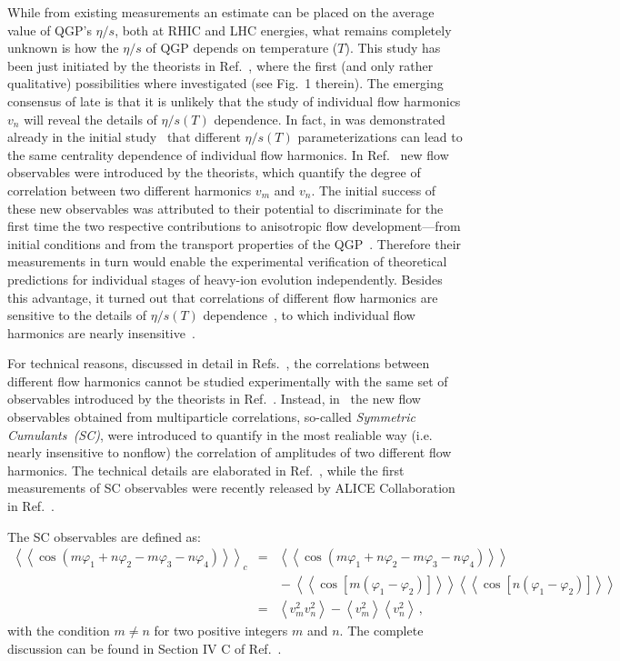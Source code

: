 While from existing measurements an estimate can be placed on the average value of QGP's $\eta/s$, both at RHIC and LHC energies, what remains completely unknown is how the $\eta/s$ of QGP depends on temperature ($T$). This study has been just initiated by the theorists in Ref.~\cite{Niemi:2015qia}, where the first (and only rather qualitative) possibilities where investigated (see Fig.~1 therein). The emerging consensus of late is that it is unlikely that the study of individual flow harmonics $v_n$ will reveal the details of $\eta/s(T)$ dependence. In fact, in was demonstrated already in the initial study~\cite{Niemi:2015qia} that different $\eta/s(T)$ parameterizations can lead to the same centrality dependence of individual flow harmonics. In Ref.~\cite{Niemi:2012aj} new flow observables were introduced by the theorists, which quantify the degree of correlation between two different harmonics $v_m$ and $v_n$. The initial success of these new observables was attributed to their potential to discriminate for the first time the two respective contributions to anisotropic flow development---from initial conditions and from the transport properties of the QGP~\cite{Niemi:2012aj}. Therefore their measurements in turn would enable the experimental verification of theoretical predictions for individual stages of heavy-ion evolution independently. Besides this advantage, it turned out that correlations of different flow harmonics are sensitive to the details of $\eta/s(T)$ dependence~\cite{ALICE:2016kpq}, to which individual flow harmonics are nearly insensitive~\cite{Niemi:2015qia}. 
 
For technical reasons, discussed in detail in Refs.~\cite{ALICE:2016kpq,Bilandzic:2013kga}, the correlations between different flow harmonics cannot be studied experimentally with the same set of observables introduced by the theorists in Ref.~\cite{Niemi:2012aj}. 
Instead, in~\cite{Bilandzic:2013kga} the new flow observables obtained from multiparticle correlations, so-called \textit{Symmetric Cumulants~(SC)}, were introduced to quantify in the most realiable way (i.e. nearly insensitive to nonflow) the correlation of amplitudes of two different flow harmonics.
The technical details are elaborated in Ref.~\cite{Bilandzic:2013kga}, while the first measurements of SC observables were recently released by ALICE Collaboration in Ref.~\cite{ALICE:2016kpq}.

The SC observables are defined as:
\begin{eqnarray}
\left<\left<\cos(m\varphi_1\!+\!n\varphi_2\!-\!m\varphi_3-\!n\varphi_4)\right>\right>_c &=& \left<\left<\cos(m\varphi_1\!+\!n\varphi_2\!-\!m\varphi_3-\!n\varphi_4)\right>\right>\nonumber\\
&&{}-\left<\left<\cos[m(\varphi_1\!-\!\varphi_2)]\right>\right>\left<\left<\cos[n(\varphi_1\!-\!\varphi_2)]\right>\right>\nonumber\\
&=&\left<v_{m}^2v_{n}^2\right>-\left<v_{m}^2\right>\left<v_{n}^2\right>\,,%
\label{eq:4p_cumulant}
\end{eqnarray}
%
with the condition $m\neq n$ for two positive integers $m$ and $n$. The complete discussion can be found in Section IV C of Ref.~\cite{Bilandzic:2013kga}.

